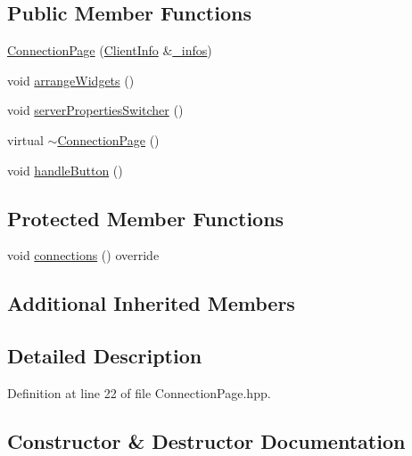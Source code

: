 \subsection*{Public Member Functions}
\begin{DoxyCompactItemize}
\item 
\mbox{\hyperlink{classbabel_1_1client_1_1_connection_page_a65273c6acd82f54d21e4655f220b1699}{Connection\+Page}} (\mbox{\hyperlink{classbabel_1_1client_1_1_client_info}{Client\+Info}} \&\mbox{\hyperlink{classbabel_1_1client_1_1_a_babel_page_aa2070ebfda878ceff938b8a60e7e2898}{\+\_\+infos}})
\item 
void \mbox{\hyperlink{classbabel_1_1client_1_1_connection_page_a655b6ae2012e677b172fb34e1db964bb}{arrange\+Widgets}} ()
\item 
void \mbox{\hyperlink{classbabel_1_1client_1_1_connection_page_adc6492dc0013dcf2ecd28ec6a370d5d4}{server\+Properties\+Switcher}} ()
\item 
virtual \mbox{\hyperlink{classbabel_1_1client_1_1_connection_page_a02be71f033c7859911f45a3dfd247bb1}{$\sim$\+Connection\+Page}} ()
\item 
void \mbox{\hyperlink{classbabel_1_1client_1_1_connection_page_a7426b5a671ce9de0827690a601ac0be8}{handle\+Button}} ()
\end{DoxyCompactItemize}
\subsection*{Protected Member Functions}
\begin{DoxyCompactItemize}
\item 
void \mbox{\hyperlink{classbabel_1_1client_1_1_connection_page_a26c103c38cfa6d25e1b6a30a76746284}{connections}} () override
\end{DoxyCompactItemize}
\subsection*{Additional Inherited Members}


\subsection{Detailed Description}


Definition at line 22 of file Connection\+Page.\+hpp.



\subsection{Constructor \& Destructor Documentation}
\mbox{\label{classbabel_1_1client_1_1_connection_page_a65273c6acd82f54d21e4655f220b1699}} 
